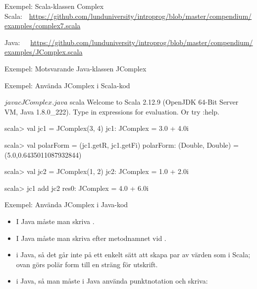 \begin{Slide}{Exempel: Scala-klassen Complex}
{\SlideFontTiny Scala:~~\url{https://github.com/lunduniversity/introprog/blob/master/compendium/examples/complex7.scala}}

{\SlideFontTiny Java:~~~\url{https://github.com/lunduniversity/introprog/blob/master/compendium/examples/JComplex.scala}}

\end{Slide}
  

\begin{Slide}{Exempel: Motsvarande Java-klassen JComplex}\SlideFontTiny\SlideOnly{\vspace{-1em}}
\end{Slide}

  
  


\begin{Slide}{Exempel: Använda JComplex i Scala-kod}
\begin{REPL}
$ javac JComplex.java
$ scala
Welcome to Scala 2.12.9 (OpenJDK 64-Bit Server VM, Java 1.8.0_222).
Type in expressions for evaluation. Or try :help.

scala> val jc1 = JComplex(3, 4)
jc1: JComplex = 3.0 + 4.0i

scala> val polarForm = (jc1.getR, jc1.getFi)
polarForm: (Double, Double) = (5.0,0.6435011087932844)

scala> val jc2 = JComplex(1, 2)
jc2: JComplex = 1.0 + 2.0i

scala> jc1 add jc2
res0: JComplex = 4.0 + 6.0i
\end{REPL}
\end{Slide}




\begin{Slide}{Exempel: Använda JComplex i Java-kod}\SlideFontSmall
{}
\begin{itemize}
\item I Java måste man skriva .  
\item I Java måste man skriva  efter metodnamnet vid .

\item {} i Java, så det går inte på ett enkelt sätt att skapa par av värden som i Scala; ovan görs polär form till en sträng för utskrift.

\item {} i Java, så man måste i Java använda punktnotation och skriva: 
\end{itemize}
\end{Slide}
  
